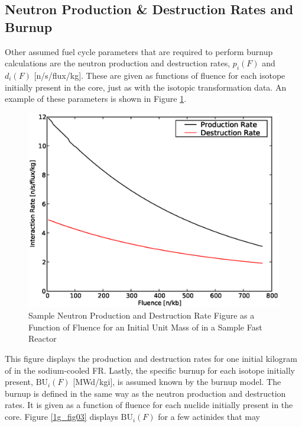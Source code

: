 \subsection{Neutron Production \& Destruction Rates and Burnup}
\label{1g_sec:pdbu}
Other assumed fuel cycle parameters that are required to perform burnup calculations are the neutron 
production and destruction rates, $p_i(F)$ and $d_i(F)$ [n/s/flux/kg].  These are given 
as functions of fluence for each isotope initially present in the core, just as with the isotopic 
transformation data.  An example of these parameters is shown in Figure \ref{1g_fig02}.
\begin{figure}[htbp]
\caption{Sample Neutron Production and Destruction Rate Figure as a Function of Fluence for an Initial Unit Mass of  in a Sample Fast Reactor}
\label{1g_fig02}
\begin{center}
\includegraphics[scale=0.5]{one_group_method/figs/Fig02.eps}
\end{center}
\end{figure}
This figure displays the production and destruction rates for one initial kilogram of  
in the sodium-cooled FR.  Lastly, the specific burnup for each isotope initially present, $\mbox{BU}_i(F)$ 
[MWd/kgi], is assumed known by the burnup model.  The burnup is defined in the same way as the neutron 
production and destruction rates.  It is given as a function of fluence for each nuclide initially 
present in the core.  Figure \ref{1g_fig03} displays $\mbox{BU}_i(F)$ for a few actinides that may 
